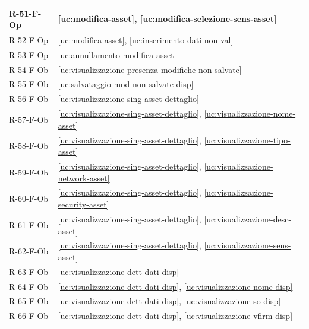 ﻿\documentclass[a4paper,12pt]{article}
\begin{document}
{\begin{longtable}{|
      >{\centering\arraybackslash}p{}|
      >{\centering\arraybackslash}p{}|
      }
            R-51-F-Op       & \ref{uc:modifica-asset}, \ref{uc:modifica-selezione-sens-asset}                 \\ \hline
            R-52-F-Op       & \ref{uc:modifica-asset}, \ref{uc:inserimento-dati-non-val}                     \\ \hline
            R-53-F-Op       & \ref{uc:annullamento-modifica-asset}                                               \\ \hline
            R-54-F-Ob       & \ref{uc:visualizzazione-presenza-modifiche-non-salvate}                                               \\ \hline
            R-55-F-Ob       & \ref{uc:salvataggio-mod-non-salvate-disp}                                               \\ \hline
            R-56-F-Ob       & \ref{uc:visualizzazione-sing-asset-dettaglio}                                              \\ \hline
            R-57-F-Ob       & \ref{uc:visualizzazione-sing-asset-dettaglio}, \ref{uc:visualizzazione-nome-asset}                 \\ \hline
            R-58-F-Ob       & \ref{uc:visualizzazione-sing-asset-dettaglio}, \ref{uc:visualizzazione-tipo-asset}                 \\ \hline
            R-59-F-Ob       & \ref{uc:visualizzazione-sing-asset-dettaglio}, \ref{uc:visualizzazione-network-asset}                 \\ \hline
            R-60-F-Ob       & \ref{uc:visualizzazione-sing-asset-dettaglio}, \ref{uc:visualizzazione-security-asset}                 \\ \hline
            R-61-F-Ob       & \ref{uc:visualizzazione-sing-asset-dettaglio}, \ref{uc:visualizzazione-desc-asset}                 \\ \hline
            R-62-F-Ob       & \ref{uc:visualizzazione-sing-asset-dettaglio}, \ref{uc:visualizzazione-sens-asset}                 \\ \hline
            R-63-F-Ob       & \ref{uc:visualizzazione-dett-dati-disp}                                               \\ \hline
            R-64-F-Ob       & \ref{uc:visualizzazione-dett-dati-disp}, \ref{uc:visualizzazione-nome-disp}                 \\ \hline
            R-65-F-Ob       & \ref{uc:visualizzazione-dett-dati-disp}, \ref{uc:visualizzazione-so-disp}                 \\ \hline
            R-66-F-Ob       & \ref{uc:visualizzazione-dett-dati-disp}, \ref{uc:visualizzazione-vfirm-disp}                 \\ \hline

\end{longtable}}
\end{document}
